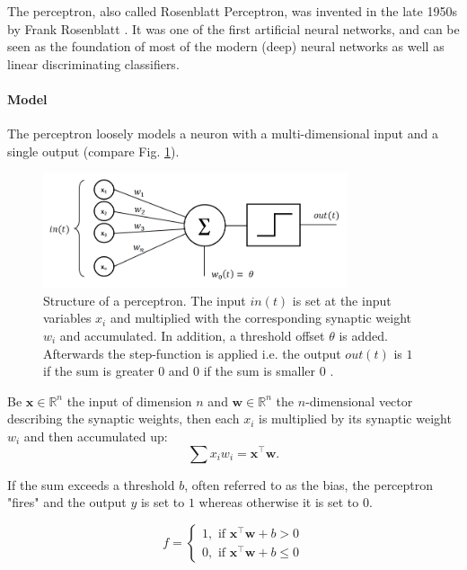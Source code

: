 The perceptron, also called Rosenblatt Perceptron, was invented in the late 1950s by Frank Rosenblatt \cite{rosenblatt1958perceptron}. 
It was one of the first artificial neural networks, and can be seen as the foundation of most of the modern (deep) neural networks as well as linear discriminating classifiers. 

\paragraph{Model} \label{c:permodel}

The perceptron loosely models a neuron with a multi-dimensional input and a single output (compare Fig. \ref{fig:perceptron}). 

\begin{figure}
	\centering
    	\includegraphics[width=0.8\textwidth]{imgs/percept.png} 
    \caption[Structure of a perceptron.]{Structure of a perceptron. The input $in(t)$ is set at the input variables $x_i$ and multiplied with the corresponding synaptic weight $w_i$ and accumulated. In addition, a threshold offset $\theta$ is added. Afterwards the step-function is applied i.e. the output $out(t)$ is $1$ if the sum is greater $0$ and $0$ if the sum is smaller $0$ \cite{perceptronImg}.}
	\label{fig:perceptron}
\end{figure}

Be $\textbf{x} \in \mathbb{R}^n$ the input of dimension $n$ and $\textbf{w}\in \mathbb{R}^n$ the $n$-dimensional vector describing the synaptic weights, then each $x_i$ is multiplied by its synaptic weight $w_i$ and then accumulated up:
\[
\sum x_i w_i = \textbf{x}^\intercal \textbf{w}.
\] 

If the sum exceeds a threshold $b$, often referred to as the bias, the perceptron "fires" and the output $y$ is set to $1$ whereas otherwise it is set to $0$.

\[
	f = 
		\begin{cases}
			1, \text{  if  } \textbf{x}^\intercal \textbf{w} + b > 0  \\
			0, \text{  if  } \textbf{x}^\intercal \textbf{w} + b \le 0
		\end{cases}	
\]

